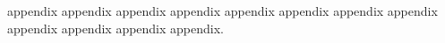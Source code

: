 appendix appendix appendix appendix appendix appendix appendix appendix appendix appendix appendix appendix.